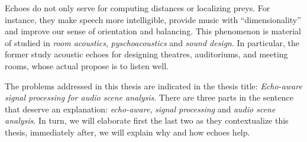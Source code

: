 \mynewline
Echoes do not only serve for computing distances or localizing preys.
For instance, they make speech more intelligible, provide music with ``dimensionality'' and improve our sense of orientation and balancing.
This phenomenon is material of studied in \textit{room acoustics}, \textit{pyschoacoustics} and \textit{sound design}.
In particular, the former study acoustic echoes for designing theatres, auditoriums, and meeting rooms, whose actual propose is to listen well.

\mynewline
The problems addressed in this thesis are indicated in the thesis title: \textit{Echo-aware signal processing for audio scene analysis}.
There are three parts in the sentence that deserve an explanation: \textit{echo-aware}, \textit{signal processing} and \textit{audio scene analysis}.
In turn, we will elaborate first the last two as they contextualize this thesis, immediately after, we will explain why and how echoes help.


